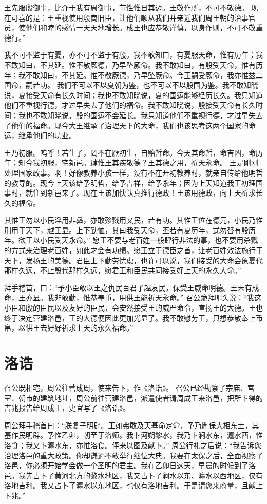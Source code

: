 \documentclass[12pt,UTF8]{ctexbook}
\begin{document}
王先服殷御事，比介于我有周御事，节性惟日其迈。王敬作所，不可不敬德。
现在可喜的是：王重视使用殷商旧臣，让他们顺从我们并亲近我们周王朝的治事官员，使他们和睦的感情一天天地增长。成王也应恭敬谨慎，以身作则，不可不敬重德行。”

我不可不监于有夏，亦不可不监于有殷。我不敢知曰，有夏服天命，惟有历年；我不敢知曰，不其延。惟不敬厥德，乃早坠厥命。我不敢知曰，有殷受天命，惟有历年；我不敢知曰，不其延。惟不敬厥德，乃早坠厥命。今王嗣受厥命，我亦惟兹二国命，嗣若功。
我们不可以不以夏朝为鉴，也不可以不以殷国为鉴。我不敢知晓说，夏接受天命有长久时间；我也不敢知晓说，夏的国运能够经历长久。我只知道他们不重视行德，才过早失去了他们的福命。我不敢知晓说，殷接受天命有长久时间；我也不敢知晓说，殷的国运不会延长。我只知道他们不重视行德，才过早失去了他们的福命。现今大王继承了治理天下的大命，我们也该思考这两个国家的命运，继承他们的功业。

王乃初服。呜呼！若生子，罔不在厥初生，自贻哲命。今天其命哲，命吉凶，命历年；知今我初服，宅新邑。肆惟王其疾敬德？王其德之用，祈天永命。
王是刚刚处理国家政事。啊！好像教养小孩一样，没有不在开初教养时，就亲自传给他明哲的教导的。现今上天该给予明哲，给予吉祥，给予永年；因为上天知道我王初理国事时，就住到新邑来了。现在王该加快认真推行德政！王该用德政，向上天祈求长久的福命。

其惟王勿以小民淫用非彝，亦敢殄戮用乂民，若有功。其惟王位在德元，小民乃惟刑用于天下，越王显。上下勤恤，其曰我受天命，丕若有夏历年，式勿替有殷历年。欲王以小民受天永命。”
愿王不要与老百姓一般肆行非法的事，也不要用杀戮的方式来治理老百姓，如此才会有功绩。愿王立于德臣之首，让老百姓效法施行于天下，发扬王的美德。君臣上下勤劳忧虑，也许可以说，我们接受的大命会象夏代那样久远，不止殷代那样久远，愿君王和臣民共同接受好上天的永久大命。”

拜手稽首，曰：“予小臣敢以王之仇民百君子越友民，保受王威命明德。王末有成命，王亦显。我非敢勤，惟恭奉币，用供王能祈天永命。”
召公跪拜叩头说：“我这小臣和殷的臣民以及友好的臣民，会安然接受王的威严命令，宣扬王的大德。王也终于决定营建洛邑，王的大德便因此更加光显了。我不敢慰劳王，只想恭敬奉上币帛，以供王去好好祈求上天的永久福命。”

\chapter{洛诰}

召公既相宅，周公往营成周，使来告卜，作《洛诰》。
召公已经勘察了宗庙、宫室、朝市的建筑地址，周公前往营建洛邑，派遣使者请周成王来洛邑，把所卜得的吉兆报告给周成王，史官写了《洛诰》。

周公拜手稽首曰：“朕复子明辟。王如弗敢及天基命定命，予乃胤保大相东土，其基作民明辟。予惟乙卯，朝至于洛师。我卜河朔黎水，我乃卜涧水东，瀍水西，惟洛食；我又卜瀍水东，亦惟洛食。伻来以图及献卜。”
周公行礼之后说：“我告诉您治理洛邑的重大政策。你却谦逊不敢举行继位大典。我要在太保之后，全面视察了洛邑，你必须开始学会做一个圣明的君主。我在乙卯日这天，早晨的时候到了洛邑。我先占卜了黄河北方的黎水地区，我又占卜了涧水以东、瀍水以西地区，仅有洛地吉利。我又占卜了瀍水以东地区，也仅有洛地吉利。于是请您来商量，且献上卜兆。”
\end{document}
